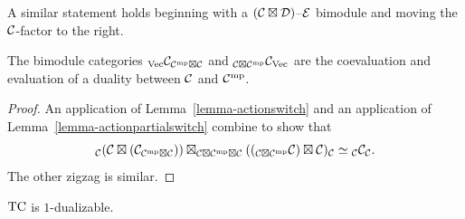 \documentclass{amsart}
\begin{document}
\nid A similar statement holds beginning with a $(\mathcal C \boxtimes \mathcal D)$--$\mathcal E$ bimodule and moving the $\mathcal C$-factor to the right.

\begin{proposition} \label{thm:objduals}
The bimodule categories ${}_\mathrm{\mathrm{Vec}} \mathcal C_{\mathcal C^{\mathrm{mp}} \boxtimes \mathcal C}$ and ${}_{\mathcal C \boxtimes \mathcal C^{\mathrm{mp}}} \mathcal C_{\mathrm{Vec}}$ are the coevaluation and evaluation of a duality between $\mathcal C$ and $\mathcal C^{\mathrm{mp}}$.
\end{proposition}
\begin{proof}
An application of Lemma~\ref{lemma-actionswitch} and an application of Lemma~\ref{lemma-actionpartialswitch} combine to show that
\[
{}_\mathcal C (\mathcal C \boxtimes (\mathcal C_{\mathcal C^{\mathrm{mp}} \boxtimes \mathcal C})) \boxtimes_{\mathcal C \boxtimes \mathcal C^{\mathrm{mp}} \boxtimes \mathcal C} (({}_{\mathcal C \boxtimes \mathcal C^{\mathrm{mp}}} \mathcal C) \boxtimes \mathcal C)_\mathcal C
\simeq
{}_\mathcal C \mathcal C_\mathcal C.
\]
The other zigzag is similar.
\end{proof}

\begin{corollary}
	$\mathrm{TC}$ is $1$-dualizable. 
\end{corollary}

\end{document}
